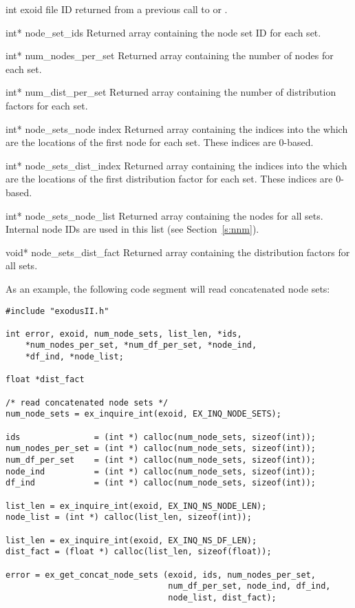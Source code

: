 \begin{parameters}
\item[{int exoid \R{}}]
\exo{} file ID returned from a previous call to 
or .

\item[{int* node_set_ids \W{}}]
Returned array containing the node set ID for each set.

\item[{int* num_nodes_per_set \W{}}]
Returned array containing the number of nodes for each set.

\item[{int* num_dist_per_set \W{}}]
Returned array containing the number of distribution factors for each
set.

\item[{int* node_sets_node index \W{}}]
Returned array containing the indices into the 
which are the locations of the first node for each set. These indices
are 0-based.

\item[{int* node_sets_dist_index \W{}}]
Returned array containing the indices into the 
which are the locations of the first distribution factor for each
set. These indices are 0-based.

\item[{int* node_sets_node_list \W{}}]
Returned array containing the nodes for all sets. Internal node IDs
are used in this list (see Section~\ref{s:nnm}).

\item[{void* node_sets_dist_fact \W{}}]
Returned array containing the distribution factors for all sets.
\end{parameters}

As an example, the following code segment will read concatenated
node sets:

\begin{lstlisting}
#include "exodusII.h"

int error, exoid, num_node_sets, list_len, *ids,
    *num_nodes_per_set, *num_df_per_set, *node_ind,
    *df_ind, *node_list;

float *dist_fact

/* read concatenated node sets */
num_node_sets = ex_inquire_int(exoid, EX_INQ_NODE_SETS);

ids               = (int *) calloc(num_node_sets, sizeof(int));
num_nodes_per_set = (int *) calloc(num_node_sets, sizeof(int));
num_df_per_set    = (int *) calloc(num_node_sets, sizeof(int));
node_ind          = (int *) calloc(num_node_sets, sizeof(int));
df_ind            = (int *) calloc(num_node_sets, sizeof(int));

list_len = ex_inquire_int(exoid, EX_INQ_NS_NODE_LEN);
node_list = (int *) calloc(list_len, sizeof(int));

list_len = ex_inquire_int(exoid, EX_INQ_NS_DF_LEN);
dist_fact = (float *) calloc(list_len, sizeof(float));

error = ex_get_concat_node_sets (exoid, ids, num_nodes_per_set,
                                 num_df_per_set, node_ind, df_ind,
                                 node_list, dist_fact);
\end{lstlisting}


